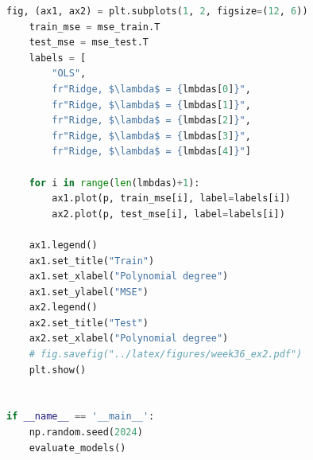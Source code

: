 \begin{figure}
\begin{lstlisting}[language=Python]
    fig, (ax1, ax2) = plt.subplots(1, 2, figsize=(12, 6))
    train_mse = mse_train.T
    test_mse = mse_test.T
    labels = [
        "OLS", 
        fr"Ridge, $\lambda$ = {lmbdas[0]}",
        fr"Ridge, $\lambda$ = {lmbdas[1]}",
        fr"Ridge, $\lambda$ = {lmbdas[2]}",
        fr"Ridge, $\lambda$ = {lmbdas[3]}",
        fr"Ridge, $\lambda$ = {lmbdas[4]}"]

    for i in range(len(lmbdas)+1):
        ax1.plot(p, train_mse[i], label=labels[i])
        ax2.plot(p, test_mse[i], label=labels[i])

    ax1.legend()
    ax1.set_title("Train")
    ax1.set_xlabel("Polynomial degree")
    ax1.set_ylabel("MSE")
    ax2.legend()
    ax2.set_title("Test")
    ax2.set_xlabel("Polynomial degree")
    # fig.savefig("../latex/figures/week36_ex2.pdf")
    plt.show()


if __name__ == '__main__':
    np.random.seed(2024)
    evaluate_models()
\end{lstlisting}
\end{figure}
